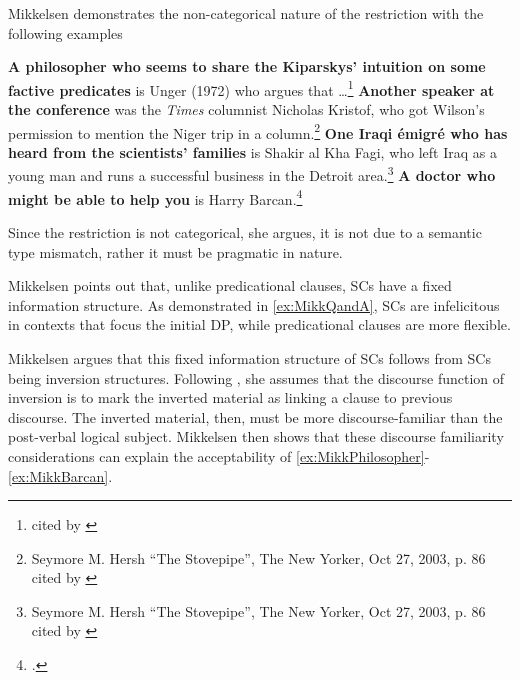 \documentclass[
	letterpaper,
]{article}
\newcommand\quelle[1]{{%
  \unskip\nobreak\hfil\penalty50
  \hskip2em\hbox{}\nobreak\hfil#1%
  \parfillskip=0pt \finalhyphendemerits=0 \par}}
\begin{document}
Mikkelsen demonstrates the non-categorical nature of the restriction with the following examples
\begin{exe}
	\ex\label{ex:MikkPhilosopher} \textbf{A philosopher who seems to share the Kiparskys' intuition on some factive predicates} is Unger (1972) who argues that \dots\footnote{\textcite[][p. 195 fn8]{delacruz1976factives} cited by \textcite[117]{mikkelsen2005copular}}
	\ex\label{ex:MikkSpeaker} \textbf{Another speaker at the conference} was the \textit{Times} columnist Nicholas Kristof, who got Wilson's permission to mention the Niger trip in a column.\footnote{Seymore M. Hersh ``The Stovepipe'', The New Yorker, Oct 27, 2003, p. 86 cited by \textcite[118]{mikkelsen2005copular}}
	\ex\label{ex:MikkEmigre} \textbf{One Iraqi \'emigr\'e who has heard from the scientists' families} is Shakir al Kha Fagi, who left Iraq as a young man and runs a successful business in the Detroit area.\footnote{Seymore M. Hersh ``The Stovepipe'', The New Yorker, Oct 27, 2003, p. 86 cited by \textcite[118]{mikkelsen2005copular}}
	\ex\label{ex:MikkBarcan} \textbf{A doctor who might be able to help you} is Harry Barcan.\footcite[118]{mikkelsen2005copular}
\end{exe}
Since the restriction is not categorical, she argues, it is not due to a semantic type mismatch, rather it must be pragmatic in nature.

Mikkelsen points out \parencite[following, among others,][]{halliday1967notes} that, unlike predicational clauses, SCs have a fixed information structure.
As demonstrated in \ref{ex:MikkQandA}, SCs are infelicitous in contexts that focus the initial DP, while predicational clauses are more flexible.
\begin{exe}
\ex\label{ex:MikkQandA}
\end{exe}

Mikkelsen argues that this fixed information structure of SCs follows from SCs being inversion structures.
Following \textcite{birner1994information,birner1996discourse}, she assumes that the discourse function of inversion is to mark the inverted material as linking a clause to previous discourse.
The inverted material, then, must be more discourse-familiar than the post-verbal logical subject.
Mikkelsen then shows that these discourse familiarity considerations can explain the acceptability of \ref{ex:MikkPhilosopher}-\ref{ex:MikkBarcan}.
\end{document}

